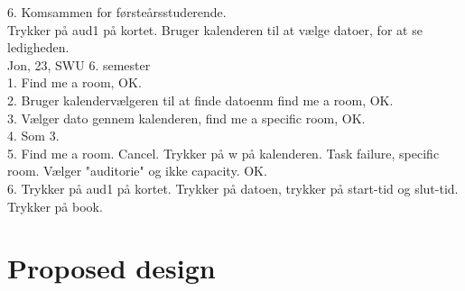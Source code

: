 6. Komsammen for førsteårsstuderende.\\
Trykker på aud1 på kortet. Bruger kalenderen til at vælge datoer, for at se ledigheden.\\




Jon, 23, SWU 6. semester\\

1.
Find me a room, OK. \\


2.
Bruger kalendervælgeren til at finde datoenm find me a room, OK.\\


3.
Vælger dato gennem kalenderen, find me a specific room, OK.\\


4. 
Som 3. \\


5.
Find me a room. Cancel. Trykker på w på kalenderen. Task failure, specific room. Vælger "auditorie" og ikke capacity. OK. \\


6.
Trykker på aud1 på kortet. Trykker på datoen, trykker på start-tid og slut-tid. Trykker på book.


\section{Proposed design}
